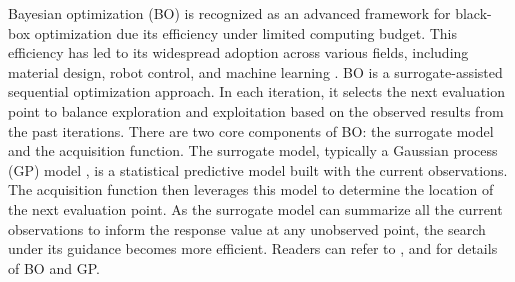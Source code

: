 \documentclass{article}
\begin{document}
\hspace{2em}
Bayesian optimization (BO) is recognized as an advanced framework for black-box optimization due its efficiency under limited computing budget. This efficiency has led to its widespread adoption across various fields, including material design\citep{Zhang2020}, robot control\citep{Ruben2017}, and machine learning \citep{snoek2012}. BO is a surrogate-assisted sequential optimization approach. In each iteration, it selects the next evaluation point to balance exploration and exploitation based on the observed results from the past iterations. There are two core components of BO: the surrogate model and the acquisition function. The surrogate model, typically a Gaussian process (GP) model \citep{Rasmussen2005Gaussian}, is a statistical predictive model built with the current observations. The acquisition function then leverages this model to determine the location of the next evaluation point. As the surrogate model can summarize all the current observations to inform the response value at any unobserved point, the search under its guidance becomes more efficient. Readers can refer to \citep{Shahriari2016taking},\citep{Frazier2018BO} and \citep{Garnett_2023} for details of BO and GP.
\end{document}
